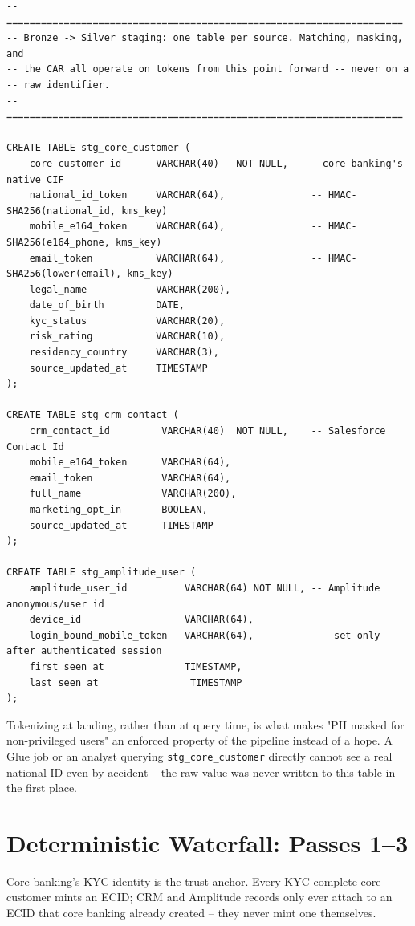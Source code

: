 \documentclass[11pt]{article}
\begin{document}
\begin{lstlisting}[language=PseudoSQL, style=codeblock]
-- =====================================================================
-- Bronze -> Silver staging: one table per source. Matching, masking, and
-- the CAR all operate on tokens from this point forward -- never on a
-- raw identifier.
-- =====================================================================

CREATE TABLE stg_core_customer (
    core_customer_id      VARCHAR(40)   NOT NULL,   -- core banking's native CIF
    national_id_token     VARCHAR(64),               -- HMAC-SHA256(national_id, kms_key)
    mobile_e164_token     VARCHAR(64),               -- HMAC-SHA256(e164_phone, kms_key)
    email_token           VARCHAR(64),               -- HMAC-SHA256(lower(email), kms_key)
    legal_name            VARCHAR(200),
    date_of_birth         DATE,
    kyc_status            VARCHAR(20),
    risk_rating           VARCHAR(10),
    residency_country     VARCHAR(3),
    source_updated_at     TIMESTAMP
);

CREATE TABLE stg_crm_contact (
    crm_contact_id         VARCHAR(40)  NOT NULL,    -- Salesforce Contact Id
    mobile_e164_token      VARCHAR(64),
    email_token            VARCHAR(64),
    full_name              VARCHAR(200),
    marketing_opt_in       BOOLEAN,
    source_updated_at      TIMESTAMP
);

CREATE TABLE stg_amplitude_user (
    amplitude_user_id          VARCHAR(64) NOT NULL, -- Amplitude anonymous/user id
    device_id                  VARCHAR(64),
    login_bound_mobile_token   VARCHAR(64),           -- set only after authenticated session
    first_seen_at              TIMESTAMP,
    last_seen_at                TIMESTAMP
);
\end{lstlisting}

\begin{rationale}
Tokenizing at landing, rather than at query time, is what makes "PII masked for non-privileged users" an enforced property of the pipeline instead of a hope. A Glue job or an analyst querying \texttt{stg\_core\_customer} directly cannot see a real national ID even by accident -- the raw value was never written to this table in the first place.
\end{rationale}

\section{Deterministic Waterfall: Passes 1--3}
Core banking's KYC identity is the trust anchor. Every KYC-complete core customer mints an ECID; CRM and Amplitude records only ever attach to an ECID that core banking already created -- they never mint one themselves.
\end{document}
